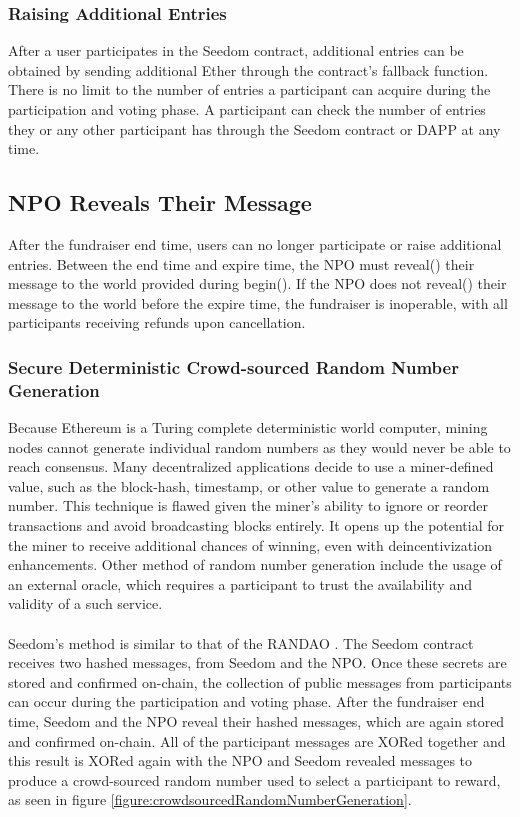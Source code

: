 \documentclass[11pt]{article}
\begin{document}
\subsubsection{Raising Additional Entries}

After a user participates in the Seedom contract, additional entries can be obtained by sending additional Ether through the contract's fallback function. There is no limit to the number of entries a participant can acquire during the participation and voting phase. A participant can check the number of entries they or any other participant has through the Seedom contract or DAPP at any time.

\subsection{NPO Reveals Their Message}

After the fundraiser end time, users can no longer participate or raise additional entries. Between the end time and expire time, the NPO must reveal() their message to the world provided during begin(). If the NPO does not reveal() their message to the world before the expire time, the fundraiser is inoperable, with all participants receiving refunds upon cancellation.

\subsubsection{Secure Deterministic Crowd-sourced Random Number Generation}
\label{sec:secureDeterministicCrowdSourcedRandomNumberGeneration}

Because Ethereum is a Turing complete deterministic world computer, mining nodes cannot generate individual random numbers as they would never be able to reach consensus. Many decentralized applications decide to use a miner-defined value, such as the block-hash, timestamp, or other value to generate a random number. This technique is flawed given the miner's ability to ignore or reorder transactions and avoid broadcasting blocks entirely. It opens up the potential for the miner to receive additional chances of winning, even with deincentivization enhancements. Other method of random number generation include the usage of an external oracle, which requires a participant to trust the availability and validity of a such service.\\\\
Seedom's method is similar to that of the RANDAO \cite{2}. The Seedom contract receives two hashed messages, from Seedom and the NPO. Once these secrets are stored and confirmed on-chain, the collection of public messages from participants can occur during the participation and voting phase. After the fundraiser end time, Seedom and the NPO reveal their hashed messages, which are again stored and confirmed on-chain. All of the participant messages are XORed together and this result is XORed again with the NPO and Seedom revealed messages to produce a crowd-sourced random number used to select a participant to reward, as seen in figure \ref{figure:crowdsourcedRandomNumberGeneration}.
\end{document}
